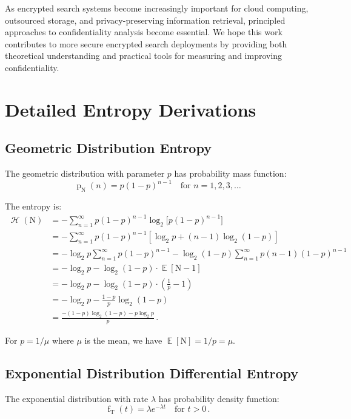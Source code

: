 \documentclass[final,11pt]{article}
\newcommand{\rv}[1]{\mathrm{#1}}
\newcommand{\entropy}{\operatorname{\mathcal{H}}}
\newcommand{\pdf}{\operatorname{f}}
\newcommand{\pmf}{\operatorname{p}}
\DeclareMathOperator{\expectation}{\mathbb{E}}
\numberwithin{equation}{section}
\theoremstyle{plain}
\theoremstyle{remark}
\begin{document}
As encrypted search systems become increasingly important for cloud computing, outsourced storage, and privacy-preserving information retrieval, principled approaches to confidentiality analysis become essential. We hope this work contributes to more secure encrypted search deployments by providing both theoretical understanding and practical tools for measuring and improving confidentiality.
\appendix
\addappheadtotoc

\section{Detailed Entropy Derivations}
\label{app:entropy_derivations}

\subsection{Geometric Distribution Entropy}
The geometric distribution with parameter $p$ has probability mass function:
\begin{equation}
    \pmf_{\rv{N}}(n) = p(1-p)^{n-1} \quad \text{for } n = 1, 2, 3, \ldots
\end{equation}

The entropy is:
\begin{equation}
\begin{split}
    \entropy(\rv{N}) &= -\sum_{n=1}^{\infty} p(1-p)^{n-1} \log_2\bigl[p(1-p)^{n-1}\bigr]\\
    &= -\sum_{n=1}^{\infty} p(1-p)^{n-1} [\log_2 p + (n-1)\log_2(1-p)]\\
    &= -\log_2 p \sum_{n=1}^{\infty} p(1-p)^{n-1} - \log_2(1-p) \sum_{n=1}^{\infty} p(n-1)(1-p)^{n-1}\\
    &= -\log_2 p - \log_2(1-p) \cdot \expectation[\rv{N} - 1]\\
    &= -\log_2 p - \log_2(1-p) \cdot \left(\frac{1}{p} - 1\right)\\
    &= -\log_2 p - \frac{1-p}{p}\log_2(1-p)\\
    &= \frac{-(1-p)\log_2(1-p) - p\log_2 p}{p}\,.
\end{split}
\end{equation}

For $p = 1/\mu$ where $\mu$ is the mean, we have $\expectation[\rv{N}] = 1/p = \mu$.

\subsection{Exponential Distribution Differential Entropy}
The exponential distribution with rate $\lambda$ has probability density function:
\begin{equation}
    \pdf_{\rv{T}}(t) = \lambda e^{-\lambda t} \quad \text{for } t > 0\,.
\end{equation}
\end{document}
